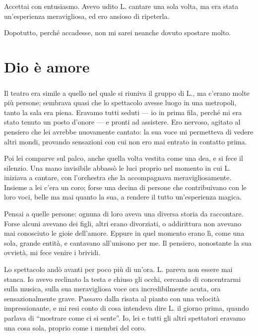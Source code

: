 \documentclass[a4paper,12pt]{book}
\begin{document}
Accettai con entusiasmo. Avevo udito L. cantare una sola volta, ma era stata
un'esperienza meravigliosa, ed ero ansioso di ripeterla.

Dopotutto, perché accadesse, non mi sarei neanche dovuto spostare molto.

\chapter{Dio è amore}

\paragraph{}
Il teatro era simile a quello nel quale si riuniva il gruppo di L., ma c'erano
molte più persone; sembrava quasi che lo spettacolo avesse luogo in una
metropoli, tanto la sala era piena. Eravamo tutti seduti --- io in prima fila,
perché mi era stato tenuto un posto d'onore --- e pronti ad assistere. Ero
nervoso, agitato al pensiero che lei avrebbe nuovamente cantato: la sua voce mi
permetteva di vedere altri mondi, provando sensazioni con cui non ero mai
entrato in contatto prima.

Poi lei comparve sul palco, anche quella volta vestita come una dea, e si fece
il silenzio. Una mano invisibile abbassò le luci proprio nel momento in cui L.
iniziava a cantare, con l'orchestra che la accompagnava meravigliosamente.
Insieme a lei c'era un coro; forse una decina di persone che contribuivano con
le loro voci, belle ma mai quanto la sua, a rendere il tutto un'esperienza
magica.

Pensai a quelle persone: ognuna di loro aveva una diversa storia da raccontare.
Forse alcuni avevano dei figli, altri erano divorziati, o addirittura non
avevano mai conosciuto le gioie dell'amore. Eppure in quel momento erano lì,
come una sola, grande entità, e cantavano all'unisono per me. Il pensiero,
nonostante la sua ovvietà, mi fece venire i brividi.

Lo spettacolo andò avanti per poco più di un'ora. L. pareva non essere mai
stanca. Io avevo reclinato la testa e chiuso gli occhi, cercando di concentrarmi
sulla musica, sulla sua meravigliosa voce ora incredibilmente acuta, ora
sensazionalmente grave. Passavo dalla risata al pianto con una velocità
impressionante, e mi resi conto di cosa intendeva dire L. il giorno prima,
quando parlava di ``mostrare come ci si sente''. Io, lei e tutti gli altri
spettatori eravamo una cosa sola, proprio come i membri del coro.
\end{document}
